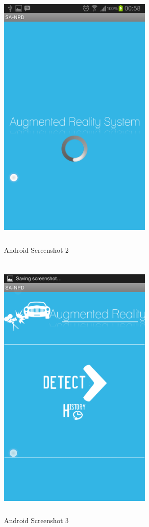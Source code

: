 \documentclass[12pt]{article}
\begin{document}
							\begin{figure}[tp]
		                             \centering
		                             \includegraphics[width=3in, height=5.333in]{Pictures/Interface_2.png}
		                             \caption{Android Screenshot 2}
		              		\end{figure}
							\begin{figure}[tp]
		                             \centering
		                             \includegraphics[width=3in, height=5.333in]{Pictures/Interface_3.png}
		                             \caption{Android Screenshot 3}
		              		\end{figure}
\end{document}

